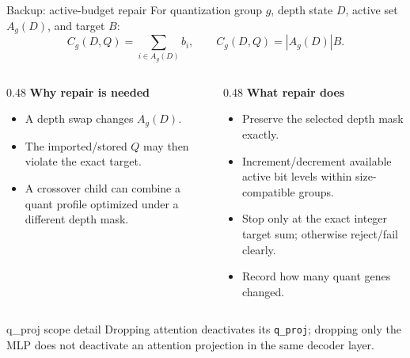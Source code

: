 \documentclass[aspectratio=169,10pt]{beamer}
\newcommand{\tightitems}{\setlength{\itemsep}{0.25em}\setlength{\parskip}{0pt}}
\begin{document}
\begin{frame}{Backup: active-budget repair}
\small
For quantization group $g$, depth state $D$, active set $A_g(D)$, and target $B$:
\[
 C_g(D,Q)=\sum_{i\in A_g(D)} b_i,
 \qquad C_g(D,Q)=|A_g(D)|B.
\]

\begin{columns}[T,onlytextwidth]
\begin{column}{0.48\textwidth}
\textbf{Why repair is needed}
\begin{itemize}\tightitems
  \item A depth swap changes $A_g(D)$.
  \item The imported/stored $Q$ may then violate the exact target.
  \item A crossover child can combine a quant profile optimized under a different depth mask.
\end{itemize}
\end{column}
\begin{column}{0.48\textwidth}
\textbf{What repair does}
\begin{itemize}\tightitems
  \item Preserve the selected depth mask exactly.
  \item Increment/decrement available active bit levels within size-compatible groups.
  \item Stop only at the exact integer target sum; otherwise reject/fail clearly.
  \item Record how many quant genes changed.
\end{itemize}
\end{column}
\end{columns}

\vspace{0.3cm}
\begin{alertblock}{q\_proj scope detail}
Dropping attention deactivates its \texttt{q\_proj}; dropping only the MLP does not deactivate an attention projection in the same decoder layer.
\end{alertblock}
\end{frame}
\end{document}

